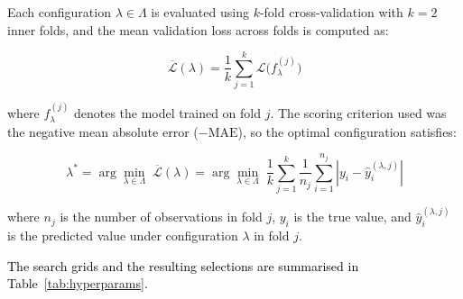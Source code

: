 \documentclass[final, 9pt, twocolumn]{saucis}
\newcommand{\rev}[1]{\textcolor{black}{#1}}
\begin{document}
Each configuration $\lambda \in \Lambda$ is evaluated using 
$k$-fold cross-validation with $k = 2$ inner folds, and the 
mean validation loss across folds is computed as:

\begin{equation}
    \overline{\mathcal{L}}(\lambda) = 
    \frac{1}{k} \sum_{j=1}^{k} \mathcal{L}\bigl(f_{\lambda}^{(j)}\bigr)
\end{equation}

where $f_{\lambda}^{(j)}$ denotes the model trained on fold $j$. 
The scoring criterion used was the negative mean absolute error 
($-\text{MAE}$), so the optimal configuration satisfies:

\begin{equation}
    \lambda^{*} = \arg\min_{\lambda \in \Lambda} \; 
    \overline{\mathcal{L}}(\lambda) = 
    \arg\min_{\lambda \in \Lambda} \; 
    \frac{1}{k} \sum_{j=1}^{k} \frac{1}{n_j} 
    \sum_{i=1}^{n_j} \left| y_i - \hat{y}_i^{(\lambda, j)} \right|
\end{equation}

where $n_j$ is the number of observations in fold $j$, $y_i$ is 
the true value, and $\hat{y}_i^{(\lambda, j)}$ is the predicted 
value under configuration $\lambda$ in fold $j$.

\rev{The search grids and the resulting selections are summarised in
Table~\ref{tab:hyperparams}.}
\end{document}
